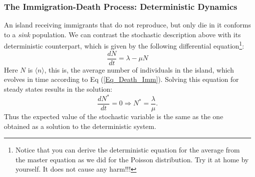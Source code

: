 \subsubsection{The Immigration-Death Process: Deterministic Dynamics}
An island receiving immigrants that do not reproduce, but only die in it conforms to a \textit{sink} population. We can contrast the stochastic description above with its deterministic counterpart, which is given by the following differential equation\footnote{Notice that you can derive the deterministic equation for the average from the master equation as we did for the Poisson distribution. Try it at home by yourself. It does not cause any harm!!!}: 
\begin{equation}
\frac{dN}{dt} = \lambda - \mu N
\label{Eq_Death_Imm}
\end{equation}
Here $N$ is $\langle n \rangle$, this is, the average number of individuals in the island, which evolves in time according to Eq (\ref{Eq_Death_Imm}).  Solving this equation for steady states results in the solution: 
$$\frac{dN^*}{dt} = 0 \Rightarrow N^* = \frac{\lambda}{\mu}. $$
Thus the expected value of the stochastic variable is the same as the one obtained as a solution to the deterministic system. 
